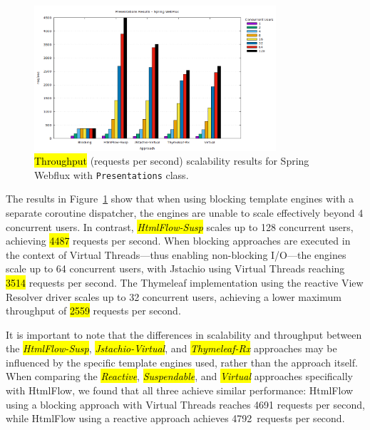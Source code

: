 \documentclass[software,article,accept,pdftex,moreauthors]{Definitions/mdpi}
\begin{document}
\begin{figure}[H]
\vspace{-6pt}
     \includegraphics[width=0.8\textwidth]{./Graphs/presentations-webflux-jmeter.png}
     \caption{\hl{Throughput} %
 (requests per second) scalability results for Spring Webflux with \texttt{Presentations} class.}\label{fig:presentations-webflux-jmeter}
\end{figure}

The results in Figure~\ref{fig:presentations-webflux-jmeter} show that when
using blocking template engines with a separate coroutine dispatcher, the
engines are unable to scale effectively beyond 4 concurrent users. In contrast,
\textit{\hl{HtmlFlow-Susp}} scales up to 128 concurrent users, achieving \hl{4487} %
requests per second. When blocking approaches are executed in the context of
Virtual Threads---thus enabling non-blocking I/O---the engines scale up to 64
concurrent users, with Jstachio using Virtual Threads reaching \hl{3514} requests
per second. The Thymeleaf implementation using the reactive View Resolver
driver scales up to 32 concurrent users, achieving a lower maximum throughput
of \hl{2559} requests per second.

It is important to note that the differences in scalability and throughput
between the \textit{\hl{HtmlFlow-Susp}}, \textit{\hl{Jstachio-Virtual}}, and
\textit{\hl{Thymeleaf-Rx}} approaches may be influenced by the specific template
engines used, rather than the approach itself. When comparing the
\textit{\hl{Reactive}}, \textit{\hl{Suspendable}}, and \textit{\hl{Virtual}} approaches
specifically with HtmlFlow, we found that all three achieve similar
performance: HtmlFlow using a blocking approach with Virtual Threads reaches
4691 requests per second, while HtmlFlow using a reactive approach achieves
4792~requests per second.
\end{document}
